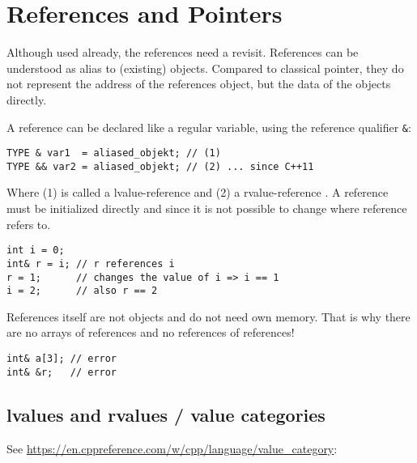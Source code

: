 \section{References and Pointers\label{sec:references}}
Although used already, the references need a revisit. References can be understood as alias to (existing) objects. Compared to classical
pointer, they do not represent the address of the references object, but the data of the objects directly.

A reference can be declared like a regular variable, using the reference qualifier \texttt{\&}:
\begin{verbatim}
TYPE & var1  = aliased_objekt; // (1)
TYPE && var2 = aliased_objekt; // (2) ... since C++11
\end{verbatim}
Where (1) is called a lvalue-reference  and (2) a rvalue-reference . A reference
must be initialized directly and since it is not possible to change where reference refers to.

\begin{verbatim}
int i = 0;
int& r = i; // r references i
r = 1;      // changes the value of i => i == 1
i = 2;      // also r == 2
\end{verbatim}

References itself are not objects and do not need own memory. That is why there are no arrays of references and no references of references!
\begin{verbatim}
int& a[3]; // error
int& &r;   // error
\end{verbatim}


\subsection{lvalues and rvalues / value categories}
See \url{https://en.cppreference.com/w/cpp/language/value_category}:


